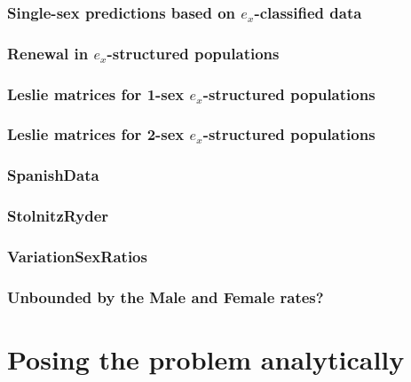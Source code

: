 \subsection{Single-sex predictions based on $e_x$-classified data}


\subsection{Renewal in $e_x$-structured populations}


\subsection{Leslie matrices for 1-sex $e_x$-structured populations}


\subsection{Leslie matrices for 2-sex $e_x$-structured populations}


\subsection{SpanishData}
 

\subsection{StolnitzRyder}
 

\subsection{VariationSexRatios}
 

\subsection{Unbounded by the Male and Female rates?}
 
  

 
 
 \chapter{Posing the problem analytically}
 \label{chap:Posing}
 
\startappendices



